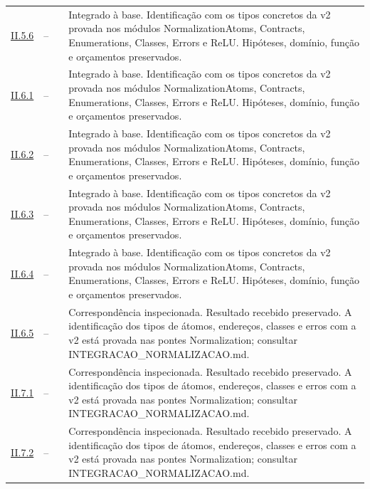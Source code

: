 \begin{longtable}{@{}p{.11\linewidth}p{.09\linewidth}p{.09\linewidth}p{.59\linewidth}@{}}
\hyperref[map:normalizacao:5.6]{II.5.6} & -- & \pageref{map:normalizacao:5.6} & Integrado à base. Identificação com os tipos concretos da v2 provada nos módulos NormalizationAtoms, Contracts, Enumerations, Classes, Errors e ReLU. Hipóteses, domínio, função e orçamentos preservados.\\[4pt]
\hyperref[map:normalizacao:6.1]{II.6.1} & -- & \pageref{map:normalizacao:6.1} & Integrado à base. Identificação com os tipos concretos da v2 provada nos módulos NormalizationAtoms, Contracts, Enumerations, Classes, Errors e ReLU. Hipóteses, domínio, função e orçamentos preservados.\\[4pt]
\hyperref[map:normalizacao:6.2]{II.6.2} & -- & \pageref{map:normalizacao:6.2} & Integrado à base. Identificação com os tipos concretos da v2 provada nos módulos NormalizationAtoms, Contracts, Enumerations, Classes, Errors e ReLU. Hipóteses, domínio, função e orçamentos preservados.\\[4pt]
\hyperref[map:normalizacao:6.3]{II.6.3} & -- & \pageref{map:normalizacao:6.3} & Integrado à base. Identificação com os tipos concretos da v2 provada nos módulos NormalizationAtoms, Contracts, Enumerations, Classes, Errors e ReLU. Hipóteses, domínio, função e orçamentos preservados.\\[4pt]
\hyperref[map:normalizacao:6.4]{II.6.4} & -- & \pageref{map:normalizacao:6.4} & Integrado à base. Identificação com os tipos concretos da v2 provada nos módulos NormalizationAtoms, Contracts, Enumerations, Classes, Errors e ReLU. Hipóteses, domínio, função e orçamentos preservados.\\[4pt]
\hyperref[map:normalizacao:6.5]{II.6.5} & -- & \pageref{map:normalizacao:6.5} & Correspondência inspecionada. Resultado recebido preservado. A identificação dos tipos de átomos, endereços, classes e erros com a v2 está provada nas pontes Normalization; consultar INTEGRACAO\_NORMALIZACAO.md.\\[4pt]
\hyperref[map:normalizacao:7.1]{II.7.1} & -- & \pageref{map:normalizacao:7.1} & Correspondência inspecionada. Resultado recebido preservado. A identificação dos tipos de átomos, endereços, classes e erros com a v2 está provada nas pontes Normalization; consultar INTEGRACAO\_NORMALIZACAO.md.\\[4pt]
\hyperref[map:normalizacao:7.2]{II.7.2} & -- & \pageref{map:normalizacao:7.2} & Correspondência inspecionada. Resultado recebido preservado. A identificação dos tipos de átomos, endereços, classes e erros com a v2 está provada nas pontes Normalization; consultar INTEGRACAO\_NORMALIZACAO.md.\\[4pt]

\end{longtable}
